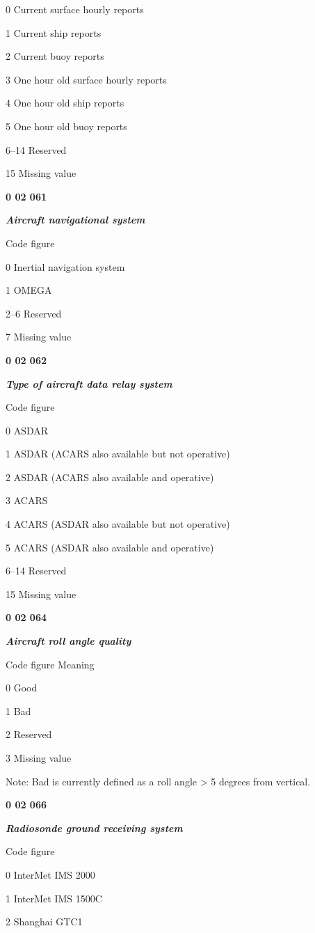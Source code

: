 0 Current surface hourly reports

1 Current ship reports

2 Current buoy reports

3 One hour old surface hourly reports

4 One hour old ship reports

5 One hour old buoy reports

6--14 Reserved

15 Missing value

\textbf{0 02 061}

\emph{\textbf{Aircraft navigational system}}

Code figure

0 Inertial navigation system

1 OMEGA

2--6 Reserved

7 Missing value

\textbf{0 02 062}

\emph{\textbf{Type of aircraft data relay system}}

Code figure

0 ASDAR

1 ASDAR (ACARS also available but not operative)

2 ASDAR (ACARS also available and operative)

3 ACARS

4 ACARS (ASDAR also available but not operative)

5 ACARS (ASDAR also available and operative)

6--14 Reserved

15 Missing value

\textbf{0 02 064}

\emph{\textbf{Aircraft roll angle quality}}

Code figure Meaning

0 Good

1 Bad

2 Reserved

3 Missing value

Note: Bad is currently defined as a roll angle \textgreater{} 5 degrees from vertical.

\textbf{0 02 066}

\emph{\textbf{Radiosonde ground receiving system}}

Code figure

0 InterMet IMS 2000

1 InterMet IMS 1500C

2 Shanghai GTC1

